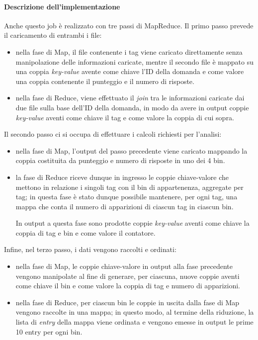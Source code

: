   \paragraph{Descrizione dell'implementazione}\label{par:job2:mapreduce:implementation}

  Anche questo job è realizzato con tre passi di MapReduce.
  Il primo passo prevede il caricamento di entrambi i file:
  \begin{itemize}
    \item
      nella fase di Map, il file contenente i tag viene caricato direttamente senza manipolazione delle informazioni caricate,
      mentre il secondo file è mappato su una coppia \textit{key-value} avente come chiave l'ID della domanda
      e come valore una coppia contenente il punteggio e il numero di risposte.

    \item
      nella fase di Reduce, viene effettuato il \textit{join} tra le informazioni caricate dai due file sulla base dell'ID della domanda,
      in modo da avere in output coppie \textit{key-value} aventi come chiave il tag e come valore la coppia di cui sopra.
  \end{itemize}

  Il secondo passo ci si occupa di effettuare i calcoli richiesti per l'analisi:
  \begin{itemize}
    \item
      nella fase di Map, l'output del passo precedente viene caricato mappando la coppia costituita da punteggio e numero di risposte in uno dei 4 bin.
    \item
      la fase di Reduce riceve dunque in ingresso le coppie chiave-valore che mettono in relazione i singoli tag con il bin di appartenenza, aggregate per tag;
      in questa fase è stato dunque possibile mantenere, per ogni tag, una mappa che conta il numero di apparizioni di ciascun tag in ciascun bin.

      In output a questa fase sono prodotte coppie \textit{key-value} aventi come chiave la coppia di tag e bin e come valore il contatore.
  \end{itemize}

  Infine, nel terzo passo, i dati vengono raccolti e ordinati:
  \begin{itemize}
    \item
      nella fase di Map, le coppie chiave-valore in output alla fase precedente vengono manipolate
      al fine di generare, per ciascuna, nuove coppie aventi come chiave il bin e come valore la coppia di tag e numero di apparizioni.
    \item
      nella fase di Reduce, per ciascun bin le coppie in uscita dalla fase di Map vengono raccolte in una mappa;
      in questo modo, al termine della riduzione, la lista di \textit{entry} della mappa viene ordinata e vengono emesse in output le prime 10 entry per ogni bin.
  \end{itemize}


